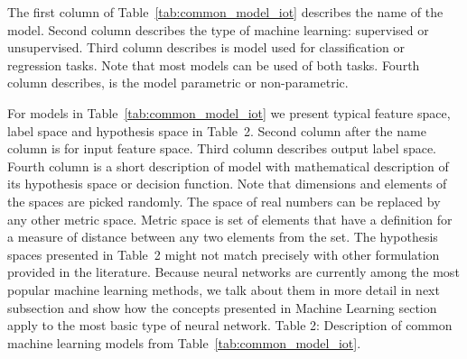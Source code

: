 \documentclass[english, 12pt, a4paper, elec, utf8, online]{aaltothesis}
\begin{document}
The first column of Table~\ref{tab:common_model_iot} describes the name of the model. Second column describes the type of machine learning: supervised or unsupervised. Third column describes is model used for classification or regression tasks. Note that most models can be used of both tasks. Fourth column describes, is the model parametric or non-parametric.

For models in Table~\ref{tab:common_model_iot} we present typical feature space, label space and hypothesis space in Table~2. Second column after the name column is for input feature space. Third column describes output label space. Fourth column is a short description of model with mathematical description of its hypothesis space or decision function. Note that dimensions and elements of the spaces are picked randomly. The space of real numbers can be replaced by any other metric space. Metric space is set of elements that have a definition for a measure of distance between any two elements from the set. The hypothesis spaces presented in Table~2 might not match precisely with other formulation provided in the literature. Because neural networks are currently among the most popular machine learning methods, we talk about them in more detail in next subsection and show how the concepts presented in Machine Learning section apply to the most basic type of neural network.      
\newpage
Table 2: Description of common machine learning models from Table~\ref{tab:common_model_iot}.
\end{document}
